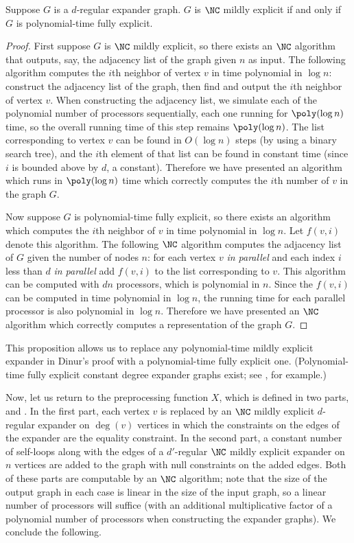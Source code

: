 \begin{proposition}
  Suppose $G$ is a $d$-regular expander graph.
  $G$ is $\NC$ mildly explicit if and only if $G$ is polynomial-time fully explicit.
\end{proposition}
\begin{proof}
  First suppose $G$ is $\NC$ mildly explicit, so there exists an $\NC$ algorithm that outputs, say, the adjacency list of the graph given $n$ as input.
  The following algorithm computes the $i$th neighbor of vertex $v$ in time polynomial in $\log n$: construct the adjacency list of the graph, then find and output the $i$th neighbor of vertex $v$.
  When constructing the adjacency list, we simulate each of the polynomial number of processors sequentially, each one running for $\poly(\log n)$ time, so the overall running time of this step remains $\poly(\log n)$.
  The list corresponding to vertex $v$ can be found in $O(\log n)$ steps (by using a binary search tree), and the $i$th element of that list can be found in constant time (since $i$ is bounded above by $d$, a constant).
  Therefore we have presented an algorithm which runs in $\poly(\log n)$ time which correctly computes the $i$th number of $v$ in the graph $G$.

  Now suppose $G$ is polynomial-time fully explicit, so there exists an algorithm which computes the $i$th neighbor of $v$ in time polynomial in $\log n$.
  Let $f(v, i)$ denote this algorithm.
  The following $\NC$ algorithm computes the adjacency list of $G$ given the number of nodes $n$: for each vertex $v$ \emph{in parallel} and each index $i$ less than $d$ \emph{in parallel} add $f(v, i)$ to the list corresponding to $v$.
  This algorithm can be computed with $dn$ processors, which is polynomial in $n$.
  Since the $f(v, i)$ can be computed in time polynomial in $\log n$, the running time for each parallel processor is also polynomial in $\log n$.
  Therefore we have presented an $\NC$ algorithm which correctly computes a representation of the graph $G$.
\end{proof}

This proposition allows us to replace any polynomial-time mildly explicit expander in Dinur's proof with a polynomial-time fully explicit one.
(Polynomial-time fully explicit constant degree expander graphs exist; see \autocite{rvw00}, for example.)

Now, let us return to the preprocessing function $X$, which is defined in two parts, \autocite[Definition~4.1]{dinur07} and \autocite[Definition~4.2]{dinur07}.
In the first part, each vertex $v$ is replaced by an $\NC$ mildly explicit $d$-regular expander on $\deg(v)$ vertices in which the constraints on the edges of the expander are the equality constraint.
In the second part, a constant number of self-loops along with the edges of a $d'$-regular $\NC$ mildly explicit expander on $n$ vertices are added to the graph with null constraints on the added edges.
Both of these parts are computable by an $\NC$ algorithm; note that the size of the output graph in each case is linear in the size of the input graph, so a linear number of processors will suffice (with an additional multiplicative factor of a polynomial number of processors when constructing the expander graphs).
We conclude the following.

